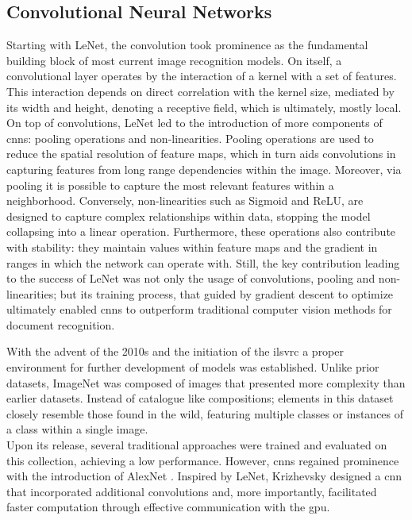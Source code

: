\subsection{Convolutional Neural Networks}
\label{rel:sub_cnn}
Starting with LeNet, the convolution took prominence as the fundamental building block 
of most current image recognition models. On itself, a convolutional layer operates by the 
interaction of a kernel with a set of features. This interaction depends on 
direct correlation with the kernel size, mediated by its width and height, denoting a receptive field,
which is ultimately, mostly local. \\

\noindent On top of convolutions, LeNet led to the introduction of more components of \glspl{cnn}: 
pooling operations and non-linearities. Pooling operations are used to reduce the spatial 
resolution of feature maps, which in turn aids convolutions in capturing features from long 
range dependencies within the image. Moreover, via pooling it is possible to capture the most 
relevant features within a neighborhood.
Conversely, non-linearities such as Sigmoid and ReLU, are designed to capture complex 
relationships within data, stopping the model collapsing into a linear operation. Furthermore, these 
operations also contribute with stability: they maintain values within feature maps and the gradient 
in ranges in which the network can operate with. %
Still, the key contribution leading to the success of LeNet was not only the usage of 
convolutions, pooling and non-linearities; but its training process, that guided by gradient descent 
to optimize ultimately enabled \glspl{cnn} to outperform traditional computer vision methods for 
document recognition. 



\noindent With the advent of the 2010s and the initiation of the \gls{ilsvrc} \autocite{ILSVRC15} 
a proper environment for further development of models was established. Unlike prior datasets, 
ImageNet was composed of images that presented more complexity than earlier datasets. Instead 
of catalogue like compositions; elements in this dataset closely resemble those found 
in the wild, featuring multiple classes or instances of a class within a single image.\\
Upon its release, several traditional approaches were trained and evaluated on this collection, 
achieving a low performance. However, \glspl{cnn} regained prominence with the introduction of
AlexNet \autocite{krizhevsky2012imagenet}. Inspired by LeNet, Krizhevsky designed a 
\gls{cnn} that incorporated additional convolutions and, more importantly, facilitated faster 
computation through effective communication with the \gls{gpu}.

